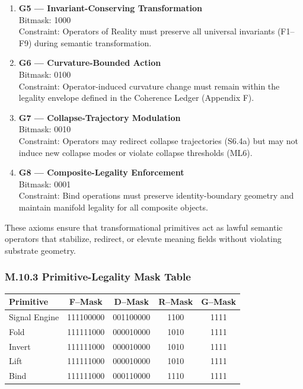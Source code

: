 \begin{enumerate}
    \item \textbf{G5 — Invariant-Conserving Transformation} \\
    Bitmask: 1000 \\
    Constraint: Operators of Reality must preserve all universal invariants
    (F1–F9) during semantic transformation.

    \item \textbf{G6 — Curvature-Bounded Action} \\
    Bitmask: 0100 \\
    Constraint: Operator-induced curvature change must remain within the
    legality envelope defined in the Coherence Ledger (Appendix F).

    \item \textbf{G7 — Collapse-Trajectory Modulation} \\
    Bitmask: 0010 \\
    Constraint: Operators may redirect collapse trajectories (S6.4a) but may
    not induce new collapse modes or violate collapse thresholds (ML6).

    \item \textbf{G8 — Composite-Legality Enforcement} \\
    Bitmask: 0001 \\
    Constraint: Bind operations must preserve identity-boundary geometry and
    maintain manifold legality for all composite objects.
\end{enumerate}

These axioms ensure that transformational primitives act as lawful semantic
operators that stabilize, redirect, or elevate meaning fields without violating
substrate geometry.


\subsubsection*{M.10.3 Primitive-Legality Mask Table}

\begin{center}
\begin{tabular}{lcccc}
\toprule
\textbf{Primitive} & \textbf{F–Mask} & \textbf{D–Mask} & \textbf{R–Mask} & \textbf{G–Mask} \\
\midrule
Signal Engine      & 111100000       & 001100000       & 1100            & 1111 \\
Fold               & 111111000       & 000010000       & 1010            & 1111 \\
Invert             & 111111000       & 000010000       & 1010            & 1111 \\
Lift               & 111111000       & 000010000       & 1010            & 1111 \\
Bind               & 111111000       & 000110000       & 1110            & 1111 \\
\bottomrule
\end{tabular}
\end{center}

